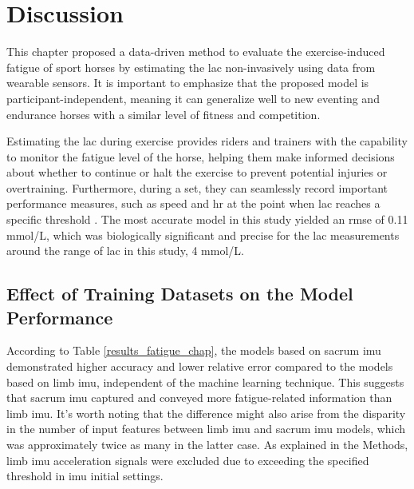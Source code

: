 \section{Discussion}
\label{sec:discussion}

This chapter proposed a data-driven method to evaluate the exercise-induced fatigue of sport horses by estimating the \gls{lac} non-invasively using data from wearable sensors. It is important to emphasize that the proposed model is participant-independent, meaning it can generalize well to new eventing and endurance horses with a similar level of fitness and competition. 

Estimating the \gls{lac} during exercise provides riders and trainers with the capability to monitor the fatigue level of the horse, helping them make informed decisions about whether to continue or halt the exercise to prevent potential injuries or overtraining. Furthermore, during a \gls{set}, they can seamlessly record important performance measures, such as speed and \gls{hr} at the point when \gls{lac} reaches a specific threshold \cite{456}. The most accurate model in this study yielded an \gls{rmse} of 0.11 \gls{mmol/L}, which was biologically significant and precise for the \gls{lac} measurements around the range of \gls{lac} in this study, 4 \gls{mmol/L}.

\subsection{Effect of Training Datasets on the Model Performance}

According to Table \ref{results_fatigue_chap}, the models based on sacrum \gls{imu} demonstrated higher accuracy and lower relative error compared to the models based on limb \gls{imu}, independent of the machine learning technique. This suggests that sacrum \gls{imu} captured and conveyed more fatigue-related information than limb \gls{imu}. It's worth noting that the difference might also arise from the disparity in the number of input features between limb \gls{imu} and sacrum \gls{imu} models, which was approximately twice as many in the latter case. As explained in the Methods, limb \gls{imu} acceleration signals were excluded due to exceeding the specified threshold in \gls{imu} initial settings.

